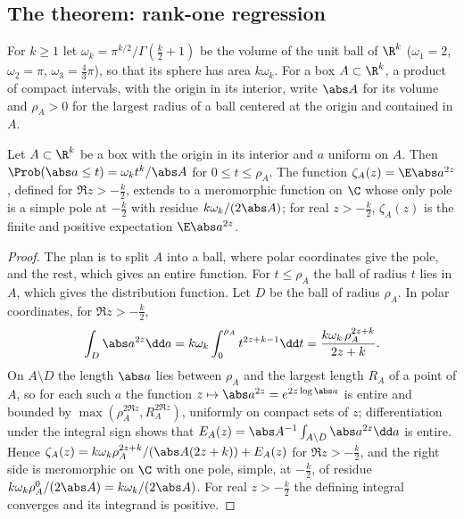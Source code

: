 \begin{refsection}
\section{The theorem: rank-one regression}\label{sec:catalogue:rankone}

For $k\ge1$ let $\omega_k=\pi^{k/2}/\Gamma(\frac k2+1)$ be the volume of the unit ball of $\R^k$ ($\omega_1=2$, $\omega_2=\pi$, $\omega_3=\frac43\pi$), so that its sphere has area $k\omega_k$. For a box $A\subset\R^k$, a product of compact intervals, with the origin in its interior, write $\abs A$ for its volume and $\rho_A>0$ for the largest radius of a ball centered at the origin and contained in $A$.

\begin{lemma}\label{lem:catalogue:norm}
Let $A\subset\R^k$ be a box with the origin in its interior and $a$ uniform on $A$. Then $\Prob(\abs a\le t)=\omega_kt^k/\abs A$ for $0\le t\le\rho_A$. The function $\zeta_A(z)=\E\abs a^{2z}$, defined for $\Re z>-\frac k2$, extends to a meromorphic function on $\C$ whose only pole is a simple pole at $-\frac k2$ with residue $k\omega_k/(2\abs A)$; for real $z>-\frac k2$, $\zeta_A(z)$ is the finite and positive expectation $\E\abs a^{2z}$.
\end{lemma}

\begin{proof}
The plan is to split $A$ into a ball, where polar coordinates give the pole, and the rest, which gives an entire function. For $t\le\rho_A$ the ball of radius $t$ lies in $A$, which gives the distribution function. Let $D$ be the ball of radius $\rho_A$. In polar coordinates, for $\Re z>-\frac k2$,
\[
\int_D\abs a^{2z}\dd a=k\omega_k\int_0^{\rho_A}t^{2z+k-1}\dd t=\frac{k\omega_k\,\rho_A^{2z+k}}{2z+k}.
\]
On $A\setminus D$ the length $\abs a$ lies between $\rho_A$ and the largest length $R_A$ of a point of $A$, so for each such $a$ the function $z\mapsto\abs a^{2z}=e^{2z\log\abs a}$ is entire and bounded by $\max(\rho_A^{2\Re z},R_A^{2\Re z})$, uniformly on compact sets of $z$; differentiation under the integral sign shows that $E_A(z)=\abs A^{-1}\int_{A\setminus D}\abs a^{2z}\dd a$ is entire. Hence $\zeta_A(z)=k\omega_k\rho_A^{2z+k}/(\abs A(2z+k))+E_A(z)$ for $\Re z>-\frac k2$, and the right side is meromorphic on $\C$ with one pole, simple, at $-\frac k2$, of residue $k\omega_k\rho_A^0/(2\abs A)=k\omega_k/(2\abs A)$. For real $z>-\frac k2$ the defining integral converges and its integrand is positive.
\end{proof}


\end{refsection}
